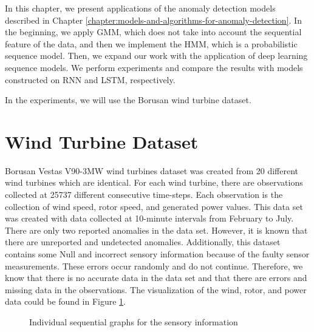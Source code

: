 In this chapter, we present applications of the anomaly detection models described in Chapter \ref{chapter:models-and-algorithms-for-anomaly-detection}.
In the beginning, we apply GMM, which does not take into account the sequential feature of the data, and then we implement the HMM, which is a probabilistic sequence model.
Then, we expand our work with the application of deep learning sequence models. 
We perform experiments and compare the results with models constructed on RNN and LSTM, respectively.

In the experiments, we will use the Borusan wind turbine dataset.

\section{Wind Turbine Dataset}

Borusan Vestas V90-3MW wind turbines dataset was created from 20 different wind turbines which are identical.
For each wind turbine, there are observations collected at 25737 different consecutive time-steps.
Each observation is the collection of wind speed, rotor speed, and generated power values.
This data set was created with data collected at 10-minute intervals from February to July.
There are only two reported anomalies in the data set. 
However, it is known that there are unreported and undetected anomalies.
Additionally, this dataset contains some Null and incorrect sensory information because of the faulty sensor measurements.
These errors occur randomly and do not continue.
Therefore, we know that there is no accurate data in the data set and that there are errors and missing data in the observations. The visualization of the wind, rotor, and power data could be found in Figure \ref{fig:data}.

\begin{figure}
\centering
    
    
    \caption{Individual sequential graphs for the sensory information}
    \label{fig:data}
\end{figure}


